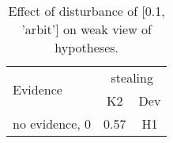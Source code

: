 \begin{table}\begin{tabular}{l|cc}\toprule\multirow{2}{*}{Evidence} & \multicolumn{2}{c}{stealing}\\& {K2} & {Dev}\\\midrule
no evidence, 0 & \cellcolor{Bittersweet}0.57&\cellcolor{Bittersweet}H1\\\bottomrule\end{tabular}\caption{Effect of disturbance of [0.1, 'arbit'] on weak view of hypotheses.}\end{table}